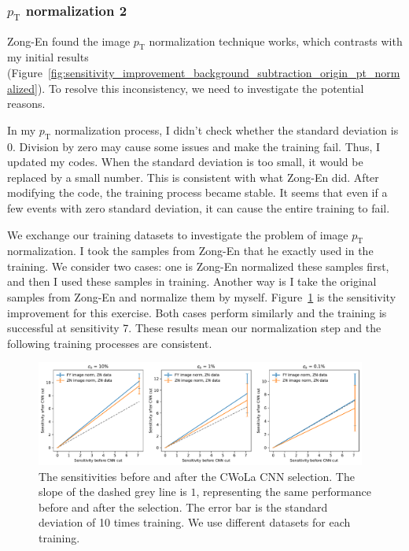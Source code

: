 \documentclass[12pt]{article}
\begin{document}
        \subsubsection{\texorpdfstring{$p_{\mathrm{T}}$}{pT} normalization 2}%
        \label{subs:pt_normalization_2}
            Zong-En found the image $p_{\text{T}}$ normalization technique works, which contrasts with my initial results (Figure~\ref{fig:sensitivity_improvement_background_subtraction_origin_pt_normalized}). To resolve this inconsistency, we need to investigate the potential reasons.

            In my $p_{\text{T}}$ normalization process, I didn't check whether the standard deviation is 0. Division by zero may cause some issues and make the training fail. Thus, I updated my codes. When the standard deviation is too small, it would be replaced by a small number. This is consistent with what Zong-En did. After modifying the code, the training process became stable. It seems that even if a few events with zero standard deviation, it can cause the entire training to fail.

            We exchange our training datasets to investigate the problem of image $p_{\text{T}}$ normalization. I took the samples from Zong-En that he exactly used in the training. We consider two cases: one is Zong-En normalized these samples first, and then I used these samples in training. Another way is I take the original samples from Zong-En and normalize them by myself. Figure~\ref{fig:sensitivity_improvement_image_pt_normalized_origin_SB_0_7_ZN_data} is the sensitivity improvement for this exercise. Both cases perform similarly and the training is successful at sensitivity 7. These results mean our normalization step and the following training processes are consistent.
            \begin{figure}[htpb]
                \centering
                \includegraphics[width=0.97\textwidth]{HVmodel_sensitivity_improvement_SB_0_7_ZN_data_res_25.pdf}
                \caption{The sensitivities before and after the CWoLa CNN selection. The slope of the dashed grey line is $1$, representing the same performance before and after the selection. The error bar is the standard deviation of 10 times training. We use different datasets for each training.}
                \label{fig:sensitivity_improvement_image_pt_normalized_origin_SB_0_7_ZN_data}
            \end{figure}
\end{document}
